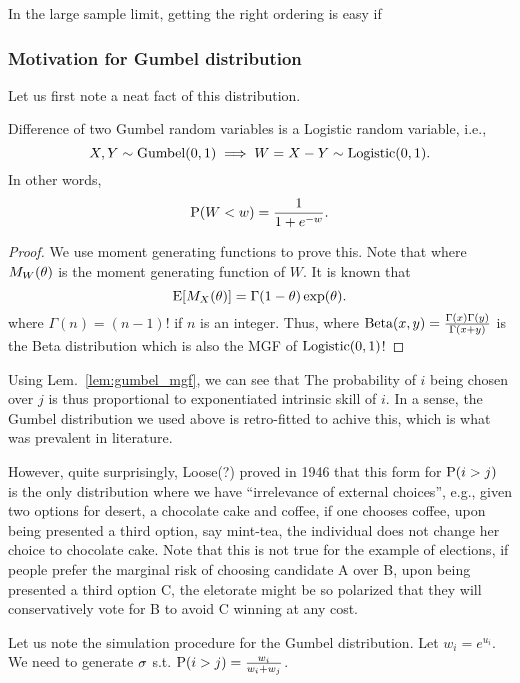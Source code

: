 \documentclass[letterpaper, 10pt]{amsart}
\begin{document}
\begin{remark}
In the large sample limit, getting the right ordering is easy if
\end{remark}

\subsubsection{Motivation for Gumbel distribution}
Let us first note a neat fact of this distribution.
\begin{lemma}
\label{lem:gumbel_mgf}
Difference of two Gumbel random variables is a Logistic random variable, i.e.,
$$
X, Y \sim \gumbel(0,1) \implies W = X-Y \sim \logistic(0,1).
$$
In other words,
$$
\P(W < w) = \f{1}{1+e^{-w}}.
$$
\end{lemma}
\begin{proof}
We use moment generating functions to prove this. Note that
where $M_W(\th)$ is the moment generating function of $W$. It is known that
$$
\E[M_X(\th)] = \Gamma(1-\th) \exp(\th).
$$
where $\Gamma(n) = (n-1)!$ if $n$ is an integer.
Thus,
where $\trm{Beta}(x,y) = \f{\Gamma(x) \Gamma(y)}{\Gamma(x+y)}$ is the Beta distribution which is also the MGF of $\logistic(0,1)$!
\end{proof}

Using Lem.~\ref{lem:gumbel_mgf}, we can see that
The probability of $i$ being chosen over $j$ is thus proportional to exponentiated intrinsic skill of $i$. In a sense, the Gumbel distribution we used above is retro-fitted to achive this, which is what was prevalent in literature.

However, quite surprisingly, Loose(?) proved in 1946 that this form for $\P(i > j)$ is the only distribution where we have ``irrelevance of external choices'', e.g., given two options for desert, a chocolate cake and coffee, if one chooses coffee, upon being presented a third option, say mint-tea, the individual does not change her choice to chocolate cake. Note that this is not true for the example of elections, if people prefer the marginal risk of choosing candidate A over B, upon being presented a third option C, the eletorate might be so polarized that they will conservatively vote for B to avoid C winning at any cost.

Let us note the simulation procedure for the Gumbel distribution. Let $w_i = e^{u_i}$. We need to generate $\s$ s.t. $\P(i > j) = \f{w_i}{w_i + w_j}$.
\end{document}
